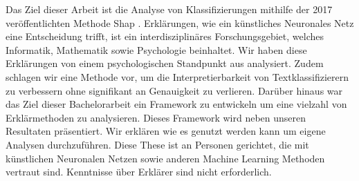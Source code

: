 
\Abstract
Das Ziel dieser Arbeit ist die Analyse von Klassifizierungen mithilfe der 2017 veröffentlichten Methode Shap \cite{shapPaper}. Erklärungen, wie ein künstliches Neuronales Netz eine Entscheidung trifft, ist ein interdisziplinäres Forschungsgebiet, welches Informatik, Mathematik sowie Psychologie beinhaltet. Wir haben diese Erklärungen von einem psychologischen Standpunkt aus analysiert. Zudem schlagen wir eine Methode vor, um die Interpretierbarkeit von Textklassifizierern zu verbessern ohne signifikant an Genauigkeit zu verlieren. Darüber hinaus war das Ziel dieser Bachelorarbeit ein Framework zu entwickeln um eine vielzahl von Erklärmethoden zu analysieren. Dieses Framework wird neben unseren Resultaten präsentiert. Wir erklären wie es genutzt werden kann um eigene Analysen durchzuführen.
Diese These ist an Personen gerichtet, die mit künstlichen Neuronalen Netzen sowie anderen Machine Learning Methoden vertraut sind. Kenntnisse über Erklärer sind nicht erforderlich.
